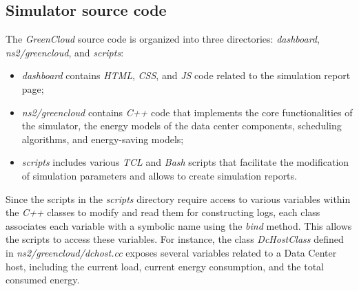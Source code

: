 \subsection{Simulator source code}
The \emph{GreenCloud} source code is organized into three directories: \emph{dashboard}, \emph{ns2/greencloud}, and \emph{scripts}:
\begin{itemize}
\item \emph{dashboard} contains \emph{HTML}, \emph{CSS}, and \emph{JS} code related to the simulation report page;
\item \emph{ns2/greencloud} contains \emph{C++} code that implements the core functionalities of the simulator, the energy models of the data center components, scheduling algorithms, and energy-saving models;
\item \emph{scripts} includes various \emph{TCL} and \emph{Bash} scripts that facilitate the modification of simulation parameters and allows to create simulation reports.
\end{itemize}
Since the scripts in the \emph{scripts} directory require access to various variables within the \emph{C++} classes to modify and read them for constructing logs, each class associates each variable with a symbolic name using the \emph{bind} method. This allows the scripts to access these variables.
For instance, the class \emph{DcHostClass} defined in \emph{ns2/greencloud/dchost.cc} exposes several variables related to a Data Center host, including the current load, current energy consumption, and the total consumed energy.

